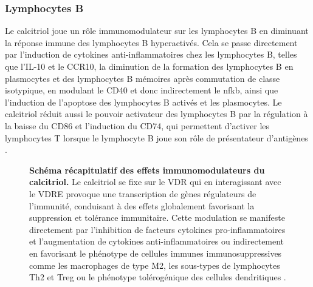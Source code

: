 \documentclass[
  a4paper,
  DIV=11,
  numbers=noendperiod,
  listof=totoc]{scrreprt}
\begin{document}
\subsubsection{Lymphocytes B}\label{lymphocytes-b}

Le calcitriol joue un rôle immunomodulateur sur les lymphocytes B en
diminuant la réponse immune des lymphocytes B hyperactivés. Cela se
passe directement par l'induction de cytokines anti-inflammatoires chez
les lymphocytes B, telles que l'\ac{IL-10} et le \ac{CCR10}, la
diminution de la formation des lymphocytes B en plasmocytes et des
lymphocytes B mémoires après commutation de classe isotypique, en
modulant le CD40 et donc indirectement le \ac{nfkb}, ainsi que
l'induction de l'apoptose des lymphocytes B activés et les plasmocytes.
Le calcitriol réduit aussi le pouvoir activateur des lymphocytes B par
la régulation à la baisse du CD86 et l'induction du CD74, qui permettent
d'activer les lymphocytes T lorsque le lymphocyte B joue son rôle de
présentateur d'antigènes \autocite{Meza-Meza.2022,Martens.2020}.

\begin{figure}


\caption[Schéma récapitulatif des effets immunomodulateurs du
calcitriol.]{\label{fig-immunomod}\textbf{Schéma récapitulatif des
effets immunomodulateurs du calcitriol.} Le calcitriol se fixe sur le
\ac{VDR} qui en interagissant avec le \ac{VDRE} provoque une
transcription de gènes régulateurs de l'immunité, conduisant à des
effets globalement favorisant la suppression et tolérance immunitaire.
Cette modulation se manifeste directement par l'inhibition de facteurs
cytokines pro-inflammatoires et l'augmentation de cytokines
anti-inflammatoires ou indirectement en favorisant le phénotype de
cellules immunes immunosuppressives comme les macrophages de type M2,
les sous-types de lymphocytes \ac{Th2} et \ac{Treg} ou le phénotype
tolérogénique des cellules dendritiques \autocite{Meza-Meza.2022}.}

\end{figure}%
\end{document}

